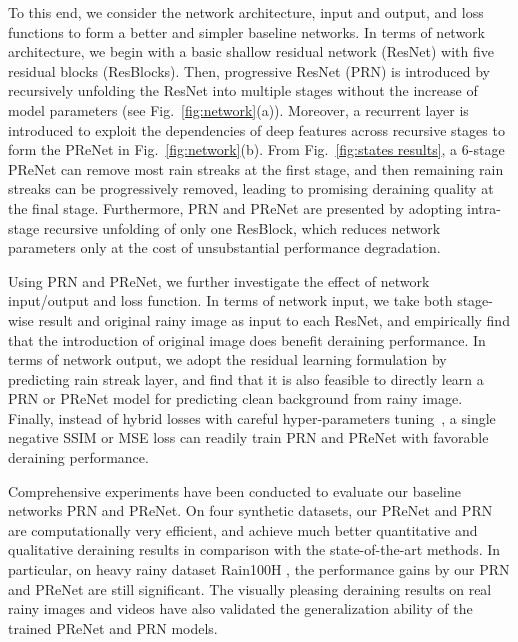 \documentclass[10pt,twocolumn,letterpaper]{article}
\begin{document}
To this end, we consider the network architecture, input and output, and loss functions to form a better and simpler baseline networks.
In terms of network architecture, we begin with a basic shallow residual network (ResNet) with five residual blocks (ResBlocks).
Then, progressive ResNet (PRN) is introduced by recursively unfolding the ResNet into multiple stages without the increase of model parameters (see Fig.~\ref{fig:network}(a)).
Moreover, a recurrent layer \cite{hochreiter1997long,xingjian2015convolutional} is introduced to exploit the dependencies of deep features across recursive stages to form the PReNet in Fig.~\ref{fig:network}(b).
From Fig.~\ref{fig:states results}, a 6-stage PReNet can remove most rain streaks at the first stage, and then remaining rain streaks can be progressively removed, leading to promising deraining quality at the final stage.
Furthermore, PRN and PReNet are presented by adopting intra-stage recursive unfolding of only one ResBlock, which reduces network parameters only at the cost of unsubstantial performance degradation.







Using PRN and PReNet, we further investigate the effect of network input/output and loss function.
In terms of network input, we take both stage-wise result and original rainy image as input to each ResNet, and empirically find that the introduction of original image does benefit deraining performance.
In terms of network output, we adopt the residual learning formulation by predicting rain streak layer, and find that it is also feasible to directly learn a PRN or PReNet model for predicting clean background from rainy image.
Finally, instead of hybrid losses with careful hyper-parameters tuning~\cite{fan2018residual,fu2017removing}, a single negative SSIM \cite{wang2004image} or MSE loss  can readily train PRN and PReNet with favorable deraining performance.



Comprehensive experiments have been conducted to evaluate our baseline networks PRN and PReNet.
On four synthetic datasets, our PReNet and PRN are computationally very efficient, and achieve much better quantitative and qualitative deraining results in comparison with the state-of-the-art methods.
In particular, on heavy rainy dataset Rain100H \cite{yang2017deep}, the performance gains by our PRN and PReNet are still significant.
The visually pleasing deraining results on real rainy images and videos have also validated the generalization ability of the trained PReNet and PRN models.
\end{document}
